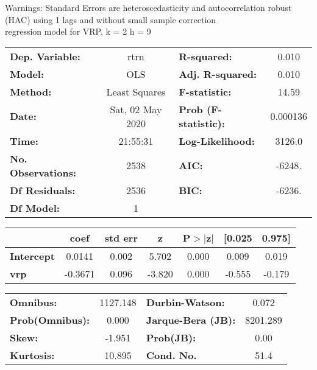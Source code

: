 Warnings: \newline
 [1] Standard Errors are heteroscedasticity and autocorrelation robust (HAC) using 1 lags and without small sample correction\\ 

regression model for VRP, k = 2 h = 9\begin{center}
\begin{tabular}{lclc}
\toprule
\textbf{Dep. Variable:}    &       rtrn       & \textbf{  R-squared:         } &     0.010   \\
\textbf{Model:}            &       OLS        & \textbf{  Adj. R-squared:    } &     0.010   \\
\textbf{Method:}           &  Least Squares   & \textbf{  F-statistic:       } &     14.59   \\
\textbf{Date:}             & Sat, 02 May 2020 & \textbf{  Prob (F-statistic):} &  0.000136   \\
\textbf{Time:}             &     21:55:31     & \textbf{  Log-Likelihood:    } &    3126.0   \\
\textbf{No. Observations:} &        2538      & \textbf{  AIC:               } &    -6248.   \\
\textbf{Df Residuals:}     &        2536      & \textbf{  BIC:               } &    -6236.   \\
\textbf{Df Model:}         &           1      & \textbf{                     } &             \\
\bottomrule
\end{tabular}
\begin{tabular}{lcccccc}
                   & \textbf{coef} & \textbf{std err} & \textbf{z} & \textbf{P$> |$z$|$} & \textbf{[0.025} & \textbf{0.975]}  \\
\midrule
\textbf{Intercept} &       0.0141  &        0.002     &     5.702  &         0.000        &        0.009    &        0.019     \\
\textbf{vrp}       &      -0.3671  &        0.096     &    -3.820  &         0.000        &       -0.555    &       -0.179     \\
\bottomrule
\end{tabular}
\begin{tabular}{lclc}
\textbf{Omnibus:}       & 1127.148 & \textbf{  Durbin-Watson:     } &    0.072  \\
\textbf{Prob(Omnibus):} &   0.000  & \textbf{  Jarque-Bera (JB):  } & 8201.289  \\
\textbf{Skew:}          &  -1.951  & \textbf{  Prob(JB):          } &     0.00  \\
\textbf{Kurtosis:}      &  10.895  & \textbf{  Cond. No.          } &     51.4  \\
\bottomrule
\end{tabular}
\end{center}


